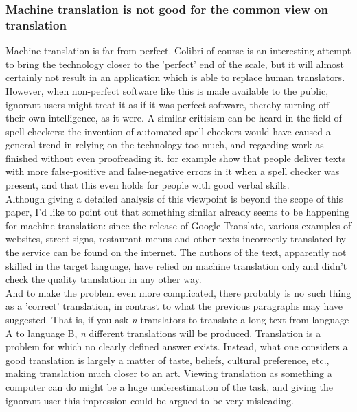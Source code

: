 \documentclass[12pt]{article}
\begin{document}
\subsubsection{Machine translation is not good for the common view on translation}

Machine translation is far from perfect. Colibri of course is an interesting attempt to bring the technology closer to the 'perfect' end of the scale, but it will almost certainly not result in an application which is able to replace human translators. However, when non-perfect software like this is made available to the public, ignorant users might treat it as if it was perfect software, thereby turning off their own intelligence, as it were. A similar critisism can be heard in the field of spell checkers: the invention of automated  spell checkers would have caused a general trend in relying on the technology too much, and regarding work as finished without even proofreading it. \citet{galletta05} for example show that people deliver texts with more false-positive and false-negative errors in it when a spell checker was present, and that this even holds for people with good verbal skills. \\\indent
Although giving a detailed analysis of this viewpoint is beyond the scope of this paper, I'd like to point out that something similar already seems to be happening for machine translation: since the release of Google Translate, various examples of websites, street signs, restaurant menus and other texts incorrectly translated by the service can be found on the internet. The authors of the text, apparently not skilled in the target language, have relied on machine translation only and didn't check the quality translation in any other way.\\\indent
And to make the problem even more complicated, there probably is no such thing as a 'correct' translation, in contrast to what the previous paragraphs may have suggested. That is, if you ask \emph{n} translators to translate a long text from language A to language B, \emph{n} different translations will be produced. Translation is a problem for which no clearly defined answer exists. Instead, what one considers a good translation is largely a matter of taste, beliefs, cultural preference, etc., making translation much closer to an art. Viewing translation as something a computer can do might be a huge underestimation of the task, and giving the ignorant user this impression could be argued to be very misleading.
\end{document}
